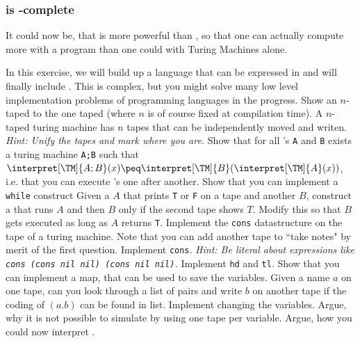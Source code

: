 \subsubsection{\TM  is \WHILE-complete}
It could now be, that \WHILE is more powerful than \TM, so that one can 
actually compute more with a \WHILE program than one could with Turing 
Machines alone.

\begin{Exercise}[title={Interpreter for \WHILE in \TM},difficulty=4]
	In this exercise, we will build up a language that can be expressed in \TM 
	and will finally include \WHILE. This is complex, but you might solve 
	many low level implementation problems of programming languages in the progress.
	\Question Show an $n$-taped \TM to the one taped (where $n$ is of course fixed at
		compilation time). A $n$-taped turing machine has $n$ tapes that can be 
		independently moved and writen. {\em Hint: Unify the tapes and mark where 
		you are.}
	\Question Show that for all \TM's {\tt A} and {\tt B} exists a turing 
			machine {\tt A;B} such that $\interpret[\TM]{A;B}(x) \peq
			\interpret[\TM]{B}(\interpret[\TM]{A}(x))$, i.e. that you can execute
			\TM's one after another.  
	\Question Show that you can implement a {\tt while} construct
		\subQuestion Given a \TM $A$ that prints {\tt T} or {\tt F} on a tape and 
			another \TM $B$, construct a  that runs $A$ 
			and then $B$ only if the second tape shows $T$.
		\subQuestion Modify this so that $B$ gets executed as long as $A$ returns {\tt T}.
	\Question Implement the {\tt cons} datastructure on the tape of a turing 
	machine. Note that you can add another tape to ``take notes" by merit of the first question.
		\subQuestion Implement {\tt cons}. {\em Hint: Be literal about 
		expressions like {\tt cons (cons nil nil) (cons nil nil)}.} 
		\subQuestion Implement {\tt hd} and {\tt tl}.
	\Question Show that you can implement a map, that can be used to save the variables.
		\subQuestion Given a name $a$ on one tape, can you look through a list of 
			pairs and write $b$ on another tape if the coding of $(a.b)$ can be found in list.
		\subQuestion Implement changing the variables.
		\subQuestion Argue, why it is not possible to simulate \WHILE by using 
			one tape per variable.
	\Question Argue, how you could now interpret \WHILE.
\end{Exercise}
